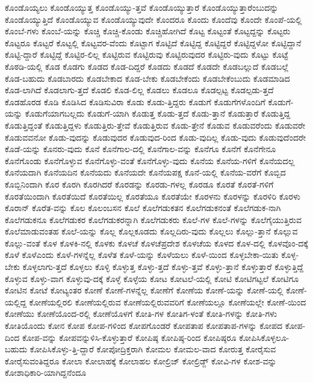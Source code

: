 {ಕೊಂಡೊಯ್ಯಲು
ಕೊಂಡೊಯ್ಯುತ್ತ
ಕೊಂಡೊಯ್ಯು-ತ್ತವೆ
ಕೊಂಡೊಯ್ಯುತ್ತಾರೆ
ಕೊಂಡೊಯ್ಯುತ್ತಾರೆಂಬುದನ್ನು
ಕೊಂಡೊಯ್ಯುತ್ತಿದೆ
ಕೊಂಡೊಯ್ಯುವ
ಕೊಂಡೊಯ್ಯುವುದೇ
ಕೊಂದರೂ
ಕೊಂದು
ಕೊಂದೆವು
ಕೊಂದೇ
ಕೊಂಪೆ-ಯಲ್ಲಿ
ಕೊಂಬೆ-ಗಳು
ಕೊಂಬೆ-ಯನ್ನು
ಕೊಚ್ಚಿ
ಕೊಚ್ಚಿ-ಕೊಂಡು
ಕೊಚ್ಚಿಹೋಗಿದೆ
ಕೊಟ್ಟ
ಕೊಟ್ಟಂತೆ
ಕೊಟ್ಟದ್ದನ್ನು
ಕೊಟ್ಟರು
ಕೊಟ್ಟರೂ
ಕೊಟ್ಟರೆ
ಕೊಟ್ಟಲ್ಲಿ
ಕೊಟ್ಟವರ-ವೆಂದು
ಕೊಟ್ಟಾಗ
ಕೊಟ್ಟಿದೆ
ಕೊಟ್ಟಿದ್ದ
ಕೊಟ್ಟಿದ್ದರೆ
ಕೊಟ್ಟಿದ್ದಳೋ
ಕೊಟ್ಟಿದ್ದಾನೆ
ಕೊಟ್ಟಿ-ದ್ದಾರೆ
ಕೊಟ್ಟಿದ್ದೆ
ಕೊಟ್ಟಿರ-ಲಿಲ್ಲ
ಕೊಟ್ಟಿರುವ
ಕೊಟ್ಟಿರುವು
ಕೊಟ್ಟಿರುವುದರ
ಕೊಟ್ಟಿರು-ವುದು
ಕೊಟ್ಟು
ಕೊಟ್ಟೆ
ಕೊಠಡಿ-ಯಲ್ಲಿ
ಕೊಡ
ಕೊಡಗು
ಕೊಡದ
ಕೊಡ-ದಿದ್ದರೆ
ಕೊಡದು
ಕೊಡದೆ
ಕೊಡದೇ
ಕೊಡಬಲ್ಲುದೆ
ಕೊಡಬಲ್ಲೆ
ಕೊಡ-ಬಹುದು
ಕೊಡಬಾರದು
ಕೊಡಬೇಕಾದ
ಕೊಡ-ಬೇಕು
ಕೊಡಬೇಕೆಂದು
ಕೊಡಬೇಕೆಂಬುದು
ಕೊಡಮಾಡಿದ
ಕೊಡ-ಲಾಗಿದೆ
ಕೊಡಲಾಗು-ತ್ತದೆ
ಕೊಡಲಿ
ಕೊಡ-ಲಿಲ್ಲ
ಕೊಡಲು
ಕೊಡಲೂ
ಕೊಡಲ್ಪಟ್ಟ
ಕೊಡಲ್ಪಡು-ತ್ತದೆ
ಕೊಡಹೊರಡ
ಕೊಡಿ
ಕೊಡಿಸಿದ
ಕೊಡಿಸುವಿರಾ
ಕೊಡು
ಕೊಡು-ತ್ತಿದ್ದರು
ಕೊಡುಗೆ
ಕೊಡುಗೆಗಳೊಂದಿಗೆ
ಕೊಡುಗೆ-ಯನ್ನು
ಕೊಡುಗೆಯಾಗಬಲ್ಲದು
ಕೊಡುಗೆ-ಯಾಗಿ
ಕೊಡುತ್ತ
ಕೊಡು-ತ್ತದೆ
ಕೊಡು-ತ್ತಾನೆ
ಕೊಡುತ್ತಾರೆ
ಕೊಡುತ್ತಿದ್ದ
ಕೊಡುತ್ತಿದ್ದಂತೆ
ಕೊಡುತ್ತಿದ್ದಳು
ಕೊಡುತ್ತಿರು-ತ್ತೇವೆ
ಕೊಡುತ್ತಿರುವ
ಕೊಡು-ತ್ತೇನೆ
ಕೊಡುವ
ಕೊಡುವರೆಂದು
ಕೊಡುವರೇ
ಕೊಡುವವನೋ
ಕೊಡು-ವುದನ್ನು
ಕೊಡುವುದರ
ಕೊಡುವುದ-ರಿಂದ
ಕೊಡು-ವುದಿಲ್ಲ
ಕೊಡು-ವುದು
ಕೊಡುವುದೆಂದರೇ
ಕೊಡೆ-ಯನ್ನು
ಕೊನರು-ವುದು
ಕೊನೆ
ಕೊನೆಗಾಲ-ದಲ್ಲಿ
ಕೊನೆಗಾಲ-ವನ್ನು
ಕೊನೆಗೂ
ಕೊನೆಗೆ
ಕೊನೆಗೇನೂ
ಕೊನೆಗೊಂಡು
ಕೊನೆಗೊಳ್ಳುವ
ಕೊನೆಗೊಳ್ಳು-ವಂತೆ
ಕೊನೆಗೊಳ್ಳು-ವುದು
ಕೊನೆಯ
ಕೊನೆಯ-ಗಳಿಗೆ
ಕೊನೆಯದಲ್ಲ
ಕೊನೆಯದಾಗಿ
ಕೊನೆಯದಿನ
ಕೊನೆಯದು
ಕೊನೆಯದೇ
ಕೊನೆಯಪಕ್ಷ
ಕೊನೆ-ಯಲ್ಲಿ
ಕೊನೆಯ-ವರೆಗೆ
ಕೊಬ್ಬಿದ
ಕೊಬ್ಬಿನಿಂದಾಗಿ
ಕೊರ
ಕೊರಗಿ
ಕೊರಗಿದರೆ
ಕೊರಡನ್ನು
ಕೊರಡು-ಗಳಲ್ಲ
ಕೊರಡೂ
ಕೊರತೆ
ಕೊರತೆ-ಗಳಿಗೆ
ಕೊರತೆಯಿಂದಾಗಿ
ಕೊರತೆಯಿದೆ
ಕೊರತೆಯಿಲ್ಲ
ಕೊರತೆಯೂ
ಕೊರತೆಯೇ
ಕೊರಳನು
ಕೊರಳನ್ನು
ಕೊರಳಿರಿ
ಕೊರಳು
ಕೊರಾನ್
ಕೊರೆತ-ವನ್ನು
ಕೊಲ
ಕೊಲಂಬಸನ
ಕೊಲೆ
ಕೊಲೆಗಡುಕತನ
ಕೊಲೆಗಡುಕನಂತೆ
ಕೊಲೆಗಡುಕ-ನಾಗಿ
ಕೊಲೆಗಡುಕನೂ
ಕೊಲೆಗಡುಕರ
ಕೊಲೆಗಡುಕರನ್ನಾಗಿ
ಕೊಲೆಗಡುಕರು
ಕೊಲೆ-ಗಳ
ಕೊಲೆ-ಗಳನ್ನು
ಕೊಲೆಗೈಯುತ್ತಿರುವ
ಕೊಲೆಮಾಡುವಂತಹ
ಕೊಲೆ-ಯನ್ನು
ಕೊಲ್ಲ
ಕೊಲ್ಲಕೂಡದು
ಕೊಲ್ಲದಿರು-ವುದು
ಕೊಲ್ಲಲು
ಕೊಲ್ಲು-ತ್ತಾನೆ
ಕೊಲ್ಲುವ
ಕೊಲ್ಲು-ವಂತೆ
ಕೊಳ
ಕೊಳಕಿ-ನಲ್ಲಿ
ಕೊಳಕು
ಕೊಳಚೆ
ಕೊಳಚೆಪ್ರದೇಶ
ಕೊಳಚೆಯ
ಕೊಳದ
ಕೊಳ-ದಲ್ಲಿ
ಕೊಳವೊಂ-ದಕ್ಕೆ
ಕೊಳೆ
ಕೊಳೆಎಂದು
ಕೊಳೆ-ಗಳನ್ನೆಲ್ಲ
ಕೊಳೆತ
ಕೊಳೆ-ಯನ್ನು
ಕೊಳೆಯಲು
ಕೊಳೆ-ಯಿಂದ
ಕೊಳ್ಳಬೇಕಾ-ಯಿತು
ಕೊಳ್ಳ-ಬೇಕು
ಕೊಳ್ಳಲಾಗು-ತ್ತದೆ
ಕೊಳ್ಳಲು
ಕೊಳ್ಳಿ
ಕೊಳ್ಳುತ್ತ
ಕೊಳ್ಳು-ತ್ತದೆ
ಕೊಳ್ಳು-ತ್ತವೆ
ಕೊಳ್ಳು-ತ್ತಾನೆ
ಕೊಳ್ಳುತ್ತಾರೆ
ಕೊಳ್ಳುತ್ತಿದ್ದೆ
ಕೊಳ್ಳುವ
ಕೊಳ್ಳು-ವಾಗ
ಕೊಳ್ಳುವು-ದಕ್ಕೆ
ಕೊಳ್ಳೆ
ಕೊಳ್ಳೆಯ
ಕೋಟ
ಕೋಟಲೆ-ಯಲ್ಲಿ
ಕೋಟಿ
ಕೋಟಿಗಟ್ಟಲೆ
ಕೋಟಿಗೂ
ಕೋಟಿನ
ಕೋಟೆ
ಕೋಟ್ಯಂತರ
ಕೋಣೆ
ಕೋಣೆ-ಗಳನ್ನೆಲ್ಲ
ಕೋಣೆಗೆ
ಕೋಣೆಯ
ಕೋಣೆ-ಯನ್ನು
ಕೋಣೆ-ಯಲ್ಲಿ
ಕೋಣೆ-ಯಲ್ಲಿದ್ದ
ಕೋಣೆಯಲ್ಲಿರಲಿ
ಕೋಣೆಯಲ್ಲಿರುವ
ಕೋಣೆಯಲ್ಲಿರುವವರಿಗೆ
ಕೋಣೆಯಲ್ಲೂ
ಕೋಣೆಯಲ್ಲೇ
ಕೋಣೆ-ಯಿಂದ
ಕೋಣೆಯು
ಕೋಣೆಯೊಂದ-ರಲ್ಲಿ
ಕೋಣೆಯೊಳಗೆ
ಕೋತಿ-ಗಳ
ಕೋತಿಗ-ಳಂತೆ
ಕೋತಿ-ಗಳನ್ನು
ಕೋತಿ-ಗಳು
ಕೋತಿಯೊಂದು
ಕೋನ
ಕೋಪ
ಕೋಪ-ಗಳಿಂದ
ಕೋಪಗೊಂಡರೆ
ಕೋಪತಾಪ
ಕೋಪತಾಪ-ಗಳನ್ನು
ಕೋಪದ
ಕೋಪ-ದಿಂದ
ಕೋಪ-ವನ್ನು
ಕೋಪವನ್ನುಳಿಸಿ-ಕೊಳ್ಳುತ್ತಾರೆ
ಕೋಪಿಷ್ಠ
ಕೋಪಿಷ್ಠ-ರಿಂದ
ಕೋಪಿಷ್ಠರೂ
ಕೋಪಿಸಿಕೊಳ್ಳಲೂ-ಬಹುದು
ಕೋಪಿಸಿಕೊಳ್ಳು-ತ್ತಿ-ದ್ದಾರೆ
ಕೋಪೋದ್ರಿಕ್ತರಾಗಿ
ಕೋಮಲ
ಕೋಮಲ-ವಾದ
ಕೋರುತ್ತ
ಕೋರೈಸುವ
ಕೋರೈಸುವಂತಿದ್ದರೂ
ಕೋಲಾ
ಕೋಲಾಹಕ್ಕೆ
ಕೋಲಾಹಲ
ಕೋಲ್ರಿಜ್
ಕೋಲ್ರಿಡ್ಜ್
ಕೋವಿ-ಗಳ
ಕೋಶ-ವನ್ನು
ಕೋಶಾಧಿಕಾರಿ-ಯಾಗಿದ್ದನೆಂದೂ
}
